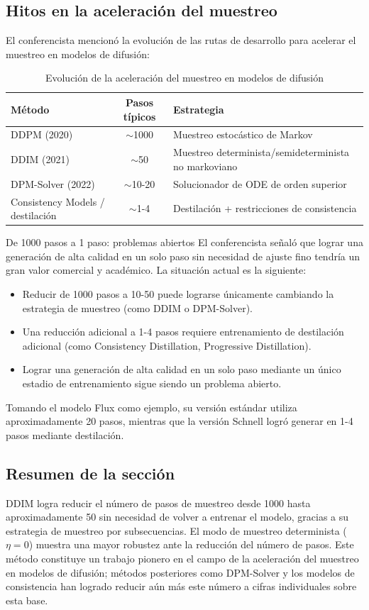 \subsection{Hitos en la aceleración del muestreo}

El conferencista mencionó la evolución de las rutas de desarrollo para acelerar el muestreo en modelos de difusión:

\begin{table}[H]
\centering
\caption{Evolución de la aceleración del muestreo en modelos de difusión}
\begin{tabular}{lcl}
\toprule
\textbf{Método} & \textbf{Pasos típicos} & \textbf{Estrategia} \\
\midrule
DDPM (2020) & $\sim$1000 & Muestreo estocástico de Markov \\
DDIM (2021) & $\sim$50 & Muestreo determinista/semideterminista no markoviano \\
DPM-Solver (2022) & $\sim$10-20 & Solucionador de ODE de orden superior \\
Consistency Models / destilación & $\sim$1-4 & Destilación + restricciones de consistencia \\
\bottomrule
\end{tabular}
\end{table}

\begin{knowledgebox}{De 1000 pasos a 1 paso: problemas abiertos}
El conferencista señaló que lograr una generación de alta calidad en un solo paso sin necesidad de ajuste fino tendría un gran valor comercial y académico. La situación actual es la siguiente:
\begin{itemize}
    \item Reducir de 1000 pasos a 10-50 puede lograrse únicamente cambiando la estrategia de muestreo (como DDIM o DPM-Solver).
    \item Una reducción adicional a 1-4 pasos requiere entrenamiento de destilación adicional (como Consistency Distillation, Progressive Distillation).
    \item Lograr una generación de alta calidad en un solo paso mediante un único estadio de entrenamiento sigue siendo un problema abierto.
\end{itemize}
Tomando el modelo Flux como ejemplo, su versión estándar utiliza aproximadamente 20 pasos, mientras que la versión Schnell logró generar en 1-4 pasos mediante destilación.
\end{knowledgebox}

\subsection{Resumen de la sección}

DDIM logra reducir el número de pasos de muestreo desde 1000 hasta aproximadamente 50 sin necesidad de volver a entrenar el modelo, gracias a su estrategia de muestreo por subsecuencias. El modo de muestreo determinista ($\eta=0$) muestra una mayor robustez ante la reducción del número de pasos. Este método constituye un trabajo pionero en el campo de la aceleración del muestreo en modelos de difusión; métodos posteriores como DPM-Solver y los modelos de consistencia han logrado reducir aún más este número a cifras individuales sobre esta base.
